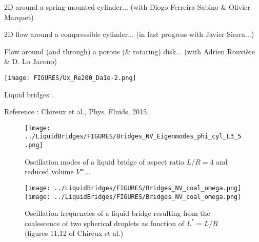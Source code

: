 \documentclass{beamer}
\begin{document}
\begin{frame}{2D around a spring-mounted cylinder...}
(with Diogo Ferreira Sabino \& Olivier Marquet)
\end{frame}



\begin{frame}{2D flow around a compressible cylinder...}
(in fast progress with Javier Sierra...)
\end{frame}

\begin{frame}{Flow around (and through) a porous (\& rotating) disk...}
(with Adrien Rouvière \& D. Lo Jacono)


\texttt{[image: FIGURES/Ux\_Re200\_Da1e-2.png]}

\end{frame}


\begin{frame}{Liquid bridges...}

\begin{description}
\item{Reference :} Chireux et al., Phys. Fluids, 2015.
\end{description}


\begin{figure}
\texttt{[image: ../LiquidBridges/FIGURES/Bridges\_NV\_Eigenmodes\_phi\_cyl\_L3\_5.png]}
\caption{Oscillation modes of a liquid bridge of aspect ratio $L/R=4$ and reduced volume $V^ =$...}
\label{Bridges_NV_Eigenmodes_phi_cyl_L3_5}
\end{figure}

\begin{figure}
\texttt{[image: ../LiquidBridges/FIGURES/Bridges\_NV\_coal\_omega.png]}
\texttt{[image: ../LiquidBridges/FIGURES/Bridges\_NV\_coal\_omega.png]}
\caption{Oscillation frequencies of a liquid bridge resulting from the coalescence of two spherical droplets
as function of $L^* =L/R$
(figures 11,12 of Chireux et al.)
}
\label{Bridges_NV_Eigenmodes_phi_cyl_L3_5}
\end{figure}


\end{frame}
\end{document}
